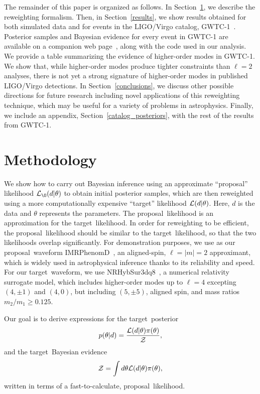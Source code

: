 \documentclass[prd,superscriptaddress,twocolumn,nopreprintnumbers,floatfix,longbibliography]{revtex4}
\newcommand{\sur}{{\sc NRHybSur3dq8}\xspace}
\newcommand{\proposal}{proposal}
\newcommand{\target}{target}
\begin{document}
The remainder of this paper is organized as follows.
In Section~\ref{method}, we describe the reweighting formalism.
Then, in Section~\ref{results}, we show results obtained for both simulated data and for events in the LIGO/Virgo catalog, GWTC-1~\cite{gwtc-1,losc}.
Posterior samples and Bayesian evidence for every event in GWTC-1 are available on a companion web page~\cite{hom-git}, along with the code used in our analysis.
We provide a table summarizing the evidence of higher-order modes in GWTC-1.
We show that, while higher-order modes produce tighter constraints than $\ell=2$ analyses, there is not yet a strong signature of higher-order modes in published LIGO/Virgo detections. 
In Section~\ref{conclusions}, we discuss other possible directions for future research including novel applications of this reweighting technique, which may be useful for a variety of problems in astrophysics.
Finally, we include an appendix, Section~\ref{catalog_posteriors}, with the rest of the results from GWTC-1.


\section{Methodology}\label{method}
We show how to carry out Bayesian inference using an approximate ``\proposal'' likelihood ${\cal L}_{\O}(d|\theta)$ to obtain initial posterior samples, which are then reweighted using a more computationally expensive ``\target'' likelihood ${\cal L}(d|\theta)$.
Here, $d$ is the data and $\theta$ represents the parameters.
The \proposal\ likelihood is an approximation for the \target\ likelihood.
In order for reweighting to be efficient, the \proposal\ likelihood should be similar to the \target\ likelihood, so that the two likelihoods overlap significantly.
For demonstration purposes, we use as our \proposal\ waveform {\sc IMRPhenomD}~\cite{IMRPhenomD}, an aligned-spin, $\ell=|m|=2$ approximant, which is widely used in astrophysical inference thanks to its reliability and speed.
For our \target\ waveform, we use \sur~\cite{NRHybSur3dq8}, a numerical relativity surrogate model, which includes higher-order modes up to $\ell=4$ excepting $(4,\pm1)$ and $(4,0)$, but including $(5,\pm5)$, aligned spin, and mass ratios $m_2/m_1\geq 0.125$.

Our goal is to derive expressions for the \target\ posterior
\begin{align}
    p(\theta|d) = \frac{{\cal L}(d|\theta) \pi(\theta)}{\cal Z} ,
\end{align}
and the \target\ Bayesian evidence
\begin{align}
    {\cal Z} = \int d\theta {\cal L}(d|\theta) \pi(\theta) ,
\end{align}
written in terms of a fast-to-calculate, \proposal\ likelihood.
\end{document}
